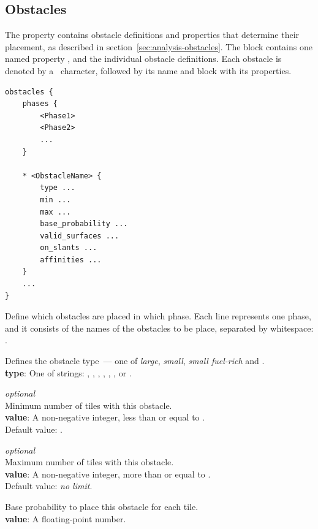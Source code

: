\subsection{Obstacles}

The  property contains obstacle definitions and properties that determine their placement, as described in section~\ref{sec:analysis-obstacles}.
The block contains one named property , and the individual obstacle definitions.
Each obstacle is denoted by a \mono{*}~character, followed by its name and block with its properties.

\begin{verbatim}
obstacles {
    phases {
        <Phase1>
        <Phase2>
        ...
    }

    * <ObstacleName> {
        type ...
        min ...
        max ...
        base_probability ...
        valid_surfaces ...
        on_slants ...
        affinities ...
    }
    ...
}
\end{verbatim}

Define which obstacles are placed in which phase.
Each line represents one phase, and it consists of the names of the obstacles to be place, separated by whitespace: .

Defines the obstacle type~--- one of \emph{large}, \emph{small}, \emph{small fuel-rich} and .\\
\textbf{type}: One of strings: , , , , , ,  or .

\emph{optional}\\
Minimum number of tiles with this obstacle.\\
\textbf{value}: A non-negative integer, less than or equal to .\\
Default value: .

\emph{optional}\\
Maximum number of tiles with this obstacle.\\
\textbf{value}: A non-negative integer, more than or equal to .\\
Default value: \emph{no limit}.

Base probability to place this obstacle for each tile.\\
\textbf{value}: A floating-point number.

